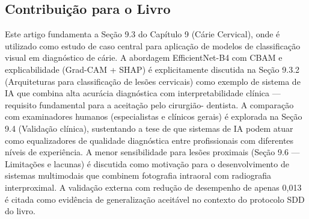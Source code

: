 \subsection{Contribuição para o Livro}
Este artigo fundamenta a Seção 9.3 do Capítulo 9 (Cárie Cervical),
onde é utilizado como estudo de caso central para aplicação de
modelos de classificação visual em diagnóstico de cárie. A abordagem
EfficientNet-B4 com CBAM e explicabilidade (Grad-CAM + SHAP) é
explicitamente discutida na Seção 9.3.2 (Arquiteturas para
classificação de lesões cervicais) como exemplo de sistema de IA
que combina alta acurácia diagnóstica com interpretabilidade
clínica --- requisito fundamental para a aceitação pelo cirurgião-
dentista. A comparação com examinadores humanos (especialistas e
clínicos gerais) é explorada na Seção 9.4 (Validação clínica),
sustentando a tese de que sistemas de IA podem atuar como
equalizadores de qualidade diagnóstica entre profissionais com
diferentes níveis de experiência. A menor sensibilidade para lesões
proximais (Seção 9.6 --- Limitações e lacunas) é discutida como
motivação para o desenvolvimento de sistemas multimodais que
combinem fotografia intraoral com radiografia interproximal. A
validação externa com redução de desempenho de apenas 0,013 é
citada como evidência de generalização aceitável no contexto do
protocolo SDD do livro.

